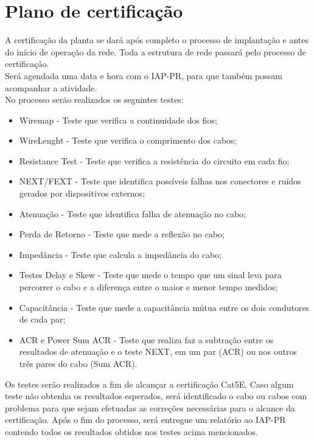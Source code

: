 \documentclass[	DIV=calc,%
							paper=a4,%
							fontsize=12pt,%
							onecolumn]{scrartcl}	 					%
\begin{document}



\section{Plano de certificação}
A certificação da planta se dará após completo o processo de implantação e antes do início de operação da rede. Toda a estrutura de rede passará pelo processo de certificação.\\
Será agendada uma data e hora com o IAP-PR, para que também possam acompanhar a atividade.\\
No processo serão realizados os seguintes testes:
\begin{itemize}
\item Wiremap - Teste que verifica a continuidade dos fios;
\item WireLenght - Teste que verifica o comprimento dos cabos;
\item Resistance Test - Teste que verifica a resistência do circuito em cada fio;
\item NEXT/FEXT - Teste que identifica possíveis falhas nos conectores e ruídos gerados por dispositivos externos;
\item Atenuação - Teste que identifica falha de atenuação no cabo;
\item Perda de Retorno - Teste que mede a reflexão no cabo;
\item Impedância - Teste que calcula a impedância do cabo;
\item Testes Delay e Skew - Teste que mede o tempo que um sinal leva para percorrer o cabo e a diferença entre o maior e menor tempo medidos;
\item Capacitância - Teste que mede a capacitância mútua entre os dois condutores de cada par;
\item ACR e Power Sum ACR - Teste que realiza faz a subtração entre os resultados de atenuação e o teste NEXT, em um par (ACR) ou nos outros três pares do cabo (Sum ACR).
\end{itemize}
\par Os testes serão realizados a fim de alcançar a certificação Cat5E.
Caso algum teste não obtenha os resultados esperados, será identificado o cabo ou cabos com problema para que sejam efetuadas as correções necessárias para o alcance da certificação.
Após o fim do processo, será entregue um relatório ao IAP-PR contendo todos os resultados obtidos nos testes acima mencionados.
\end{document}
